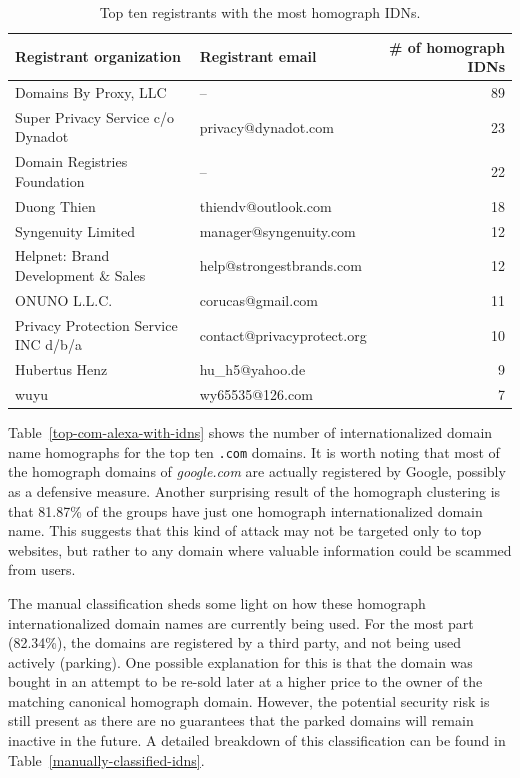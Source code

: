 \documentclass[letterpaper,twocolumn,10pt]{article}
\begin{document}
\begin{table}[]
\centering
\begin{tabular}{llr}
\hline
Registrant organization              & Registrant email           & \# of homograph IDNs \\ \hline
Domains By Proxy, LLC                & --                         & 89                   \\
Super Privacy Service c/o Dynadot    & privacy@dynadot.com        & 23                   \\
Domain Registries Foundation         & --                         & 22                   \\
Duong Thien                          & thiendv@outlook.com        & 18                   \\
Syngenuity Limited                   & manager@syngenuity.com     & 12                   \\
Helpnet: Brand Development \& Sales  & help@strongestbrands.com   & 12                   \\
ONUNO L.L.C.                         & corucas@gmail.com          & 11                   \\
Privacy Protection Service INC d/b/a & contact@privacyprotect.org & 10                   \\
Hubertus Henz                        & hu\_h5@yahoo.de            & 9                    \\
wuyu                                 & wy65535@126.com            & 7                    \\ \hline
\end{tabular}
\caption{Top ten registrants with the most homograph IDNs.}
\label{top-registrants-homograph-idns}
\end{table}

Table~\ref{top-com-alexa-with-idns} shows the number of internationalized domain name homographs for the top ten \texttt{.com} domains.
It is worth noting that most of the homograph domains of \textit{google.com} are actually registered by Google, possibly as a defensive measure.
Another surprising result of the homograph clustering is that 81.87\% of the groups have just one homograph internationalized domain name.
This suggests that this kind of attack may not be targeted only to top websites, but rather to any domain where valuable information could be scammed from users.

The manual classification sheds some light on how these homograph internationalized domain names are currently being used.
For the most part (82.34\%), the domains are registered by a third party, and not being used actively (parking).
One possible explanation for this is that the domain was bought in an attempt to be re-sold later at a higher price to the owner of the matching canonical homograph domain.
However, the potential security risk is still present as there are no guarantees that the parked domains will remain inactive in the future.
A detailed breakdown of this classification can be found in Table~\ref{manually-classified-idns}.
\end{document}
